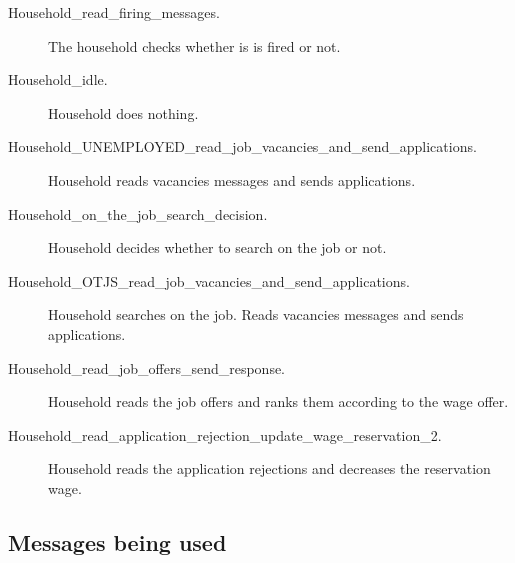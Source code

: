 \begin{description}
\item[Household\_read\_firing\_messages.] The household checks whether is is fired or
 not.
\item[Household\_idle.] Household does nothing.
\item[Household\_UNEMPLOYED\_read\_job\_vacancies\_and\_send\_applications.] Household reads vacancies messages and sends applications.
\item[Household\_on\_the\_job\_search\_decision.] Household decides whether to search on the job or not.
\item[Household\_OTJS\_read\_job\_vacancies\_and\_send\_applications.] Household
searches on the job. Reads vacancies messages and sends
applications.
\item[Household\_read\_job\_offers\_send\_response.] Household reads the job offers and ranks them
according to the wage offer.
\item[Household\_read\_application\_rejection\_update\_wage\_reservation\_2.] Household reads the application rejections and decreases the
reservation wage.
\end{description}




\subsection{Messages being used}



